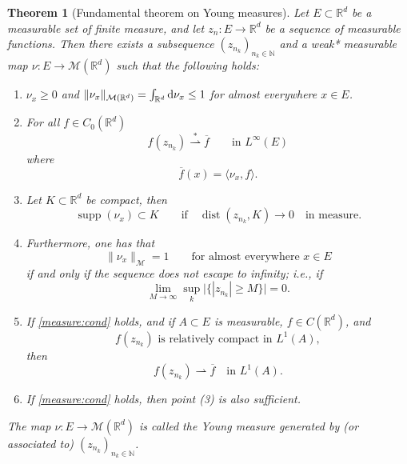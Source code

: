 \documentclass[a4paper,doc,11pt]{article}
\newtheorem{theorem}{Theorem}[section]
\newcommand{\R}{\mathbb{R}}
\newcommand{\N}{\mathbb{N}}
\DeclareMathOperator{\dist}{dist}
\DeclareMathOperator{\supp}{supp}
\begin{document}
\begin{theorem}[Fundamental theorem on Young measures]
    Let \(E \subset \R^d\) be a measurable set of finite measure, and let \(z_n : E \to \R^d\) be a sequence of measurable functions. Then there exists a subsequence \((z_{n_k})_{n_k \in \N}\) and a weak* measurable map \(\nu: E \to \mathcal{M}(\R^d)\) such that the following holds:
    
    \begin{enumerate}
        \item \(\nu_x\geq 0\) and \( \|\nu_x\|_{\mathcal{M}(\R^d)} = \int_{\R^d} \dif \nu_x \leq 1 \) for almost everywhere \(x\in E\).
        
        \item For all \(f \in C_0(\R^d)\)
        \[
            f(z_{n_k}) \overset{*}{\rightharpoonup} \overline{f}    \qquad \text{in } L^\infty (E)
        \]
        where
        \[
            \overline{f}(x) = \langle \nu_x,f \rangle.
        \]
        
        \item Let \(K \subset \R^d\) be compact, then 
        \[
            \supp(\nu_x) \subset K
            \qquad\text{if}
            \quad
            \dist(z_{n_k}, K) \to 0
            \quad
            \text{in measure}.
        \]
        
        \item Furthermore, one has that 
        \begin{equation}
        \label{measure:cond}
            \|\nu_x\|_{\mathcal{M}} = 1 \qquad \text{for almost everywhere } x\in E
            \tag{$i'$}
        \end{equation}
            if and only if the sequence does not escape to infinity; i.e., if
            \[
                \lim_{M\to \infty} \sup_k \big| \big\{ |z_{n_k}| \geq M \big\} \big| = 0.
            \]
        
        \item If \eqref{measure:cond} holds, and if \(A \subset E\) is measurable, \(f \in C(\R^d)\), and 
        \[
            f(z_{n_k}) \text{ is relatively compact in } L^1(A),
        \]
        then
        \[
            f(z_{n_k}) \rightharpoonup \overline{f} \quad \text{in } L^1(A).
        \]
        
        \item If \eqref{measure:cond} holds, then point (3) is also sufficient.
    \end{enumerate}
    
    The map \(\nu: E \to \mathcal{M}(\R^d)\) is called the \emph{Young measure} generated by (or associated to) \((z_{n_k})_{n_k \in \N}\).
\end{theorem}
\end{document}
